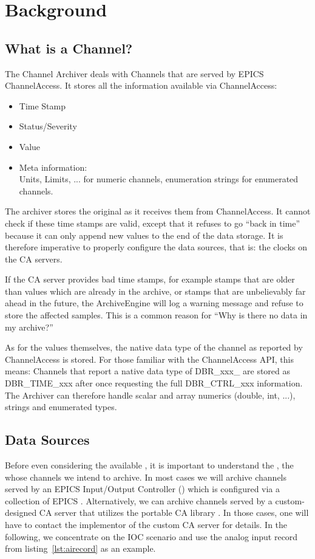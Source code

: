 \chapter{Background}

\section{What is a Channel?} %
The Channel Archiver deals with Channels that are served by EPICS
ChannelAccess. It stores all the information available via ChannelAccess:
\begin{itemize}
\item Time Stamp
\item Status/Severity
\item Value
\item Meta information:\\
      Units, Limits, ... for numeric channels,
      enumeration strings for enumerated channels.
\end{itemize}

\noindent The archiver stores the original  as it receives
them from ChannelAccess. It cannot check if these time stamps are valid, except
that it refuses to go ``back in time'' because it can only append new
values to the end of the data storage. It is therefore imperative to
properly configure the data sources, that is: the clocks on the CA
servers.

\label{back:in:time}
\NOTE If the CA server provides bad time stamps, for example stamps
that are older than values which are already in the archive, or stamps
that are unbelievably far ahead in the future, the ArchiveEngine will log
a warning message and refuse to store the affected samples.
This is a common reason for ``Why is there no data in my archive?''

As for the values themselves, the native data type of the channel as
reported by ChannelAccess is stored. For those familiar with the
ChannelAccess API, this means:
Channels that report a native data type of DBR\_xxx\_ are stored as
DBR\_TIME\_xxx after once requesting the full DBR\_CTRL\_xxx information.
 The Archiver can therefore handle scalar and array numerics
(double, int, ...), strings and enumerated types. 

\section{Data Sources} %
Before even considering the available , it is
important to understand the , the  whose channels we intend to archive.
In most cases we will archive channels served by an EPICS Input/Output
Controller () which is configured via a collection of EPICS
.
Alternatively, we can archive channels served by a custom-designed CA
server that utilizes the portable CA library .
In those cases, one will have to contact the implementor of the custom
CA server for details.
In the following, we concentrate on the IOC scenario and use the
analog input record from listing~\ref{lst:airecord} as an example.

